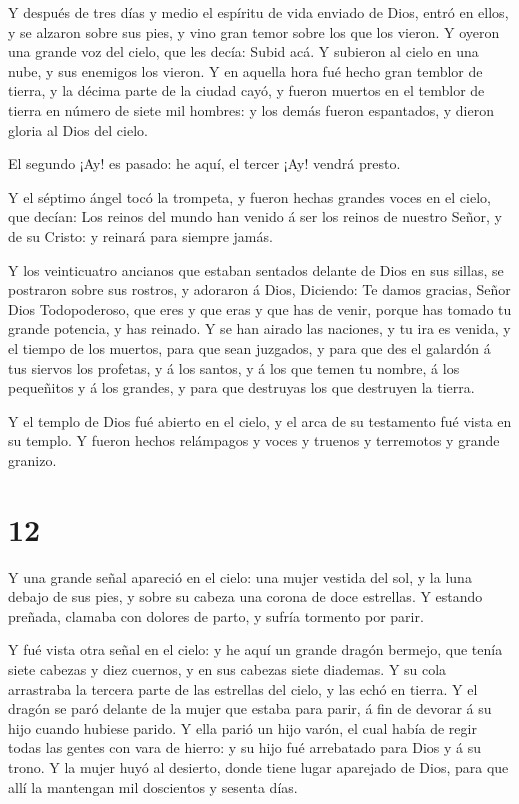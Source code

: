  Y después de tres días y medio el espíritu de vida enviado
de Dios, entró en ellos, y se alzaron sobre sus pies, y vino gran temor
sobre los que los vieron.  Y oyeron una grande voz del
cielo, que les decía: Subid acá. Y subieron al cielo en una nube, y sus
enemigos los vieron.  Y en aquella hora fué hecho gran
temblor de tierra, y la décima parte de la ciudad cayó, y fueron muertos
en el temblor de tierra en número de siete mil hombres: y los demás
fueron espantados, y dieron gloria al Dios del cielo.

 El segundo ¡Ay! es pasado: he aquí, el tercer ¡Ay! vendrá
presto.

 Y el séptimo ángel tocó la trompeta, y fueron hechas
grandes voces en el cielo, que decían: Los reinos del mundo han venido á
ser los reinos de nuestro Señor, y de su Cristo: y reinará para siempre
jamás.

 Y los veinticuatro ancianos que estaban sentados delante
de Dios en sus sillas, se postraron sobre sus rostros, y adoraron á
Dios,  Diciendo: Te damos gracias, Señor Dios Todopoderoso,
que eres y que eras y que has de venir, porque has tomado tu grande
potencia, y has reinado.  Y se han airado las naciones, y
tu ira es venida, y el tiempo de los muertos, para que sean juzgados, y
para que des el galardón á tus siervos los profetas, y á los santos, y á
los que temen tu nombre, á los pequeñitos y á los grandes, y para que
destruyas los que destruyen la tierra.

 Y el templo de Dios fué abierto en el cielo, y el arca de
su testamento fué vista en su templo. Y fueron hechos relámpagos y voces
y truenos y terremotos y grande granizo.

\hypertarget{section-11}{%
\section{12}\label{section-11}}

 Y una grande señal apareció en el cielo: una mujer vestida
del sol, y la luna debajo de sus pies, y sobre su cabeza una corona de
doce estrellas.  Y estando preñada, clamaba con dolores de
parto, y sufría tormento por parir.

 Y fué vista otra señal en el cielo: y he aquí un grande
dragón bermejo, que tenía siete cabezas y diez cuernos, y en sus cabezas
siete diademas.  Y su cola arrastraba la tercera parte de
las estrellas del cielo, y las echó en tierra. Y el dragón se paró
delante de la mujer que estaba para parir, á fin de devorar á su hijo
cuando hubiese parido.  Y ella parió un hijo varón, el cual
había de regir todas las gentes con vara de hierro: y su hijo fué
arrebatado para Dios y á su trono.  Y la mujer huyó al
desierto, donde tiene lugar aparejado de Dios, para que allí la
mantengan mil doscientos y sesenta días.


